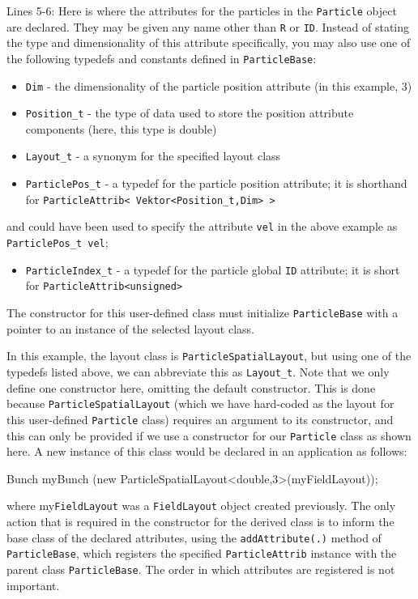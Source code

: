 Lines 5-6: Here is where the attributes for the particles in the \texttt{Particle} object are declared. They may be given any name other than \texttt{R} or \texttt{ID}. Instead of stating the type and dimensionality of this attribute specifically, you may also use one of the following typedefs and constants defined in \texttt{ParticleBase}:
\begin{itemize}
          \item \texttt{Dim} - the dimensionality of the particle position attribute (in this example, 3)
          \item \texttt{Position\_t} - the type of data used to store the position attribute components (here, this type is double)
          \item \texttt{Layout\_t} - a synonym for the specified layout class
          \item \texttt{ParticlePos\_t} - a typedef for the particle position attribute; it is shorthand for \texttt{ParticleAttrib< Vektor<Position\_t,Dim> >}
\end{itemize}
and could have been used to specify the attribute \texttt{vel} in the above example as \texttt{ParticlePos\_t vel};
\begin{itemize}
\item \texttt{ParticleIndex\_t} - a typedef for the particle global \texttt{ID} attribute; it is short for \texttt{ParticleAttrib<unsigned>} 
\end{itemize}
The constructor for this user-defined class must initialize \texttt{ParticleBase} with a pointer to an instance of the selected layout class. 

In this example, the layout class is \texttt{ParticleSpatialLayout}, but using one of the typedefs listed above, we can abbreviate this as \texttt{Layout\_t}. Note that we only define one constructor here, omitting the default constructor. This is done because \texttt{ParticleSpatialLayout} (which we have hard-coded as the layout for this user-defined \texttt{Particle} class) requires an argument to its constructor, and this can only be provided if we use a constructor for our \texttt{Particle} class as shown here. A new instance of this class would be declared in an application as follows:
\begin{smallcode}
Bunch myBunch (new ParticleSpatialLayout<double,3>(myFieldLayout)); 
\end{smallcode}
where my\texttt{FieldLayout} was a \texttt{FieldLayout} object created previously. The only action that is required in the constructor for the derived class is to inform the base class of the declared attributes, 
using the \texttt{addAttribute(.)} method of \texttt{ParticleBase}, which registers the specified \texttt{ParticleAttrib} instance with the parent class \texttt{ParticleBase}. The order in which attributes are registered is not important.

